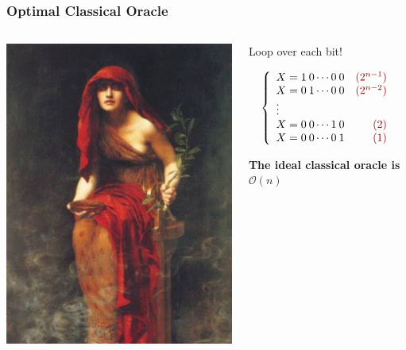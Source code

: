 \documentclass[aspectratio=169,11pt,hyperref={colorlinks=true}]{beamer}
\begin{document}
\begin{frame}
    \frametitle{Optimal Classical Oracle}
	\begin{columns}
        \begin{column}{.3\textwidth}
            \centering
            \includegraphics[width=\textwidth]{the_oracle.jpg}
        \end{column}
        \begin{column}{.7\textwidth}
            \centering
            Loop over each bit!
            \begin{flushleft}
            \[\left \{
                \begin{array}{lr}
                    X = 1\>0 \dotsb 0\>0 & \color{openstack} (2^{n-1})\\
                    X = 0\>1 \dotsb 0\>0 & \color{openstack} (2^{n-2})\\
                   \vdots  \\
                    X = 0\>0 \dotsb 1\>0 & \color{openstack} (2)\\
                    X = 0\>0 \dotsb 0\>1  & \color{openstack} (1)
                 \end{array}
               \right.
           \]
            \end{flushleft}
            \begin{center}
            \large \textbf{The ideal classical oracle is $\mathcal{O}(n)$}
            \end{center}
        \end{column}
    \end{columns}
\end{frame}
\end{document}
